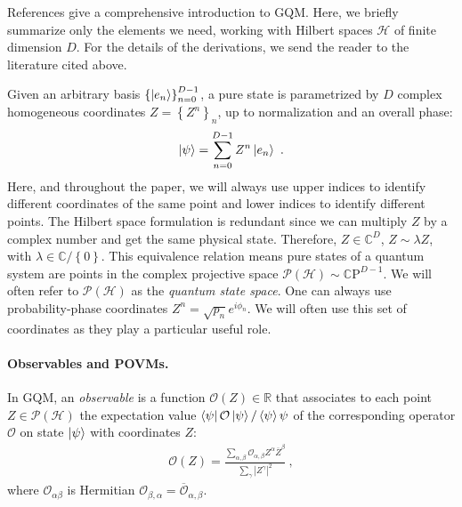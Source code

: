 \documentclass[draft,nofootinbib,pre,twocolumn,showpacs,showkeys,preprintnumbers,floatfix]{revtex4-1}
\newcommand{\1}{\mathbbm{1}}
\newcommand{\PH}{\mathcal{P}(\mathcal{H})}
\begin{document}
References
\cite{STROCCHI1966,Miel68,Kibble1979,Heslot1985,Page87,And90,Gibbons1992,Ashtekar1995,Ashtekar1999,Brody2001,Bengtsson2017,Carinena2007,Chruscinski2006,Marmo2010,Avron2020,Pastorello2015,Pastorello2015a,Pastorello2016,Clemente-Gallardo2013}
give a comprehensive introduction to GQM. Here, we briefly summarize only the
elements we need, working with Hilbert spaces $\mathcal{H}$ of finite dimension $D$.
For the details of the derivations, we send the reader to the literature cited above.

Given an arbitrary basis $\left\{\ket{e_n} \right\}_{n=0}^{D-1}$, a pure state is
parametrized by $D$ complex homogeneous coordinates $Z = \left\{      Z^n\right\}_n$, up to
normalization and an overall phase:
\begin{align*}
\ket{\psi} = \sum_{n=0}^{D-1} Z^n \ket{e_n}~.
\end{align*}
Here, and throughout the paper, we will always use upper indices to identify different 
coordinates of the same point and lower indices to identify different points. The Hilbert space
formulation is redundant since we can multiply $Z$ by a complex number and get the same 
physical state. Therefore, $Z \in \mathbb{C}^{D}$, $Z \sim \lambda Z$, with $\lambda \in \mathbb{C}/\left\{ 0\right\}$. This equivalence 
relation means pure states of a quantum system are points in the complex projective space $\mathcal{P}\left(
\mathcal{H} \right) \sim \mathbb{C}\mathrm{P}^{D-1}$. We will often refer to $\PH$ as the \emph{quantum 
state space}. One can always use probability-phase coordinates $Z^n = \sqrt{p_n} e^{i\phi_n}$. We will often use 
this set of coordinates as they play a particular useful role.

\paragraph*{Observables and POVMs.} In GQM, an \emph{observable} is a function $\mathcal{O}(Z) \in
\mathbb{R}$ that associates to each point  $Z \in \mathcal{P}(\mathcal{H})$ the
expectation value $\bra{\psi} \mathcal{O} \ket{\psi}/\braket{\psi}{\psi}$ of the corresponding
operator $\mathcal{O}$ on state $\ket{\psi}$ with coordinates $Z$:
\begin{align}
\mathcal{O}(Z) = \frac{\sum_{\alpha,\beta} \mathcal{O}_{\alpha,\beta}Z^\alpha \overline{Z}^\beta}{\sum_{\gamma} \left\vert Z^\gamma\right\vert^2}
  ~,
\label{eq:GQM_Observable}
\end{align}
where $\mathcal{O}_{\alpha \beta}$ is Hermitian $\mathcal{O}_{\beta,\alpha} = \overline{\mathcal{O}}_{\alpha,\beta}$.
\end{document}
